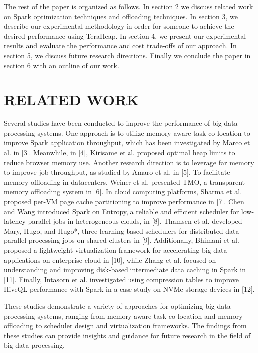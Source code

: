 \documentclass[twocolumn,10pt]{asme2e}
\begin{document}
The rest of the paper is organized as follows. In section 2 we discuss related work on Spark optimization techniques and offloading techniques. In section 3, we describe our experimental methodology in order for someone to achieve the desired performance using TeraHeap. In section 4, we present our experimental results and evaluate the performance and cost trade-offs of our approach. In section 5, we discuss future research directions. Finally we conclude the paper in section 6 with an outline of our work.

\section*{RELATED WORK}

Several studies have been conducted to improve the performance of big data processing systems. One approach is to utilize memory-aware task co-location to improve Spark application throughput, which has been investigated by Marco et al. in [3]. Meanwhile, in [4], Kirisame et al. proposed optimal heap limits to reduce browser memory use. Another research direction is to leverage far memory to improve job throughput, as studied by Amaro et al. in [5]. To facilitate memory offloading in datacenters, Weiner et al. presented TMO, a transparent memory offloading system in [6]. In cloud computing platforms, Sharma et al. proposed per-VM page cache partitioning to improve performance in [7]. Chen and Wang introduced Spark on Entropy, a reliable and efficient scheduler for low-latency parallel jobs in heterogeneous clouds, in [8]. Thamsen et al. developed Mary, Hugo, and Hugo*, three learning-based schedulers for distributed data-parallel processing jobs on shared clusters in [9]. Additionally, Bhimani et al. proposed a lightweight virtualization framework for accelerating big data applications on enterprise cloud in [10], while Zhang et al. focused on understanding and improving disk-based intermediate data caching in Spark in [11]. Finally, Intasorn et al. investigated using compression tables to improve HiveQL performance with Spark in a case study on NVMe storage devices in [12]. 

These studies demonstrate a variety of approaches for optimizing big data processing systems, ranging from memory-aware task co-location and memory offloading to scheduler design and virtualization frameworks. The findings from these studies can provide insights and guidance for future research in the field of big data processing.
\end{document}
